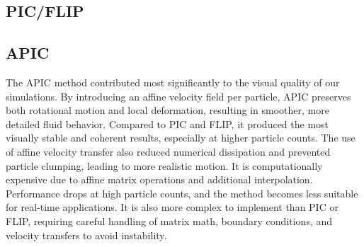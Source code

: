 \subsection{PIC/FLIP}

\subsection{APIC}
The APIC method contributed most significantly to the visual quality of our simulations. By introducing an affine velocity field per particle, APIC preserves both rotational motion and local deformation, resulting in smoother, more detailed fluid behavior. Compared to PIC and FLIP, it produced the most visually stable and coherent results, especially at higher particle counts. The use of affine velocity transfer also reduced numerical dissipation and prevented particle clumping, leading to more realistic motion.
It is computationally expensive due to affine matrix operations and additional interpolation. Performance drops at high particle counts, and the method becomes less suitable for real-time applications. It is also more complex to implement than PIC or FLIP, requiring careful handling of matrix math, boundary conditions, and velocity transfers to avoid instability.